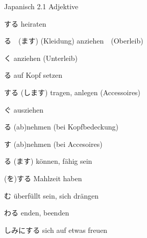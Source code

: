 \begin{multicols*}{2}
\begin{flushleft}
\begin{labeling}{Japanisch 2.1 Adjektive}
	\item [\ruby{結婚}{けっこん}する] heiraten
	\item [\ruby{着}{き}る　(\ruby{着}{き}ます)] (Kleidung) anziehen　(Oberleib)
	\item [\ruby{履}{は}く] anziehen (Unterleib)
	\item [\ruby{被}{かぶ}る] auf Kopf setzen
	\item [する (します)] tragen, anlegen (Accessoires)
	\item [\ruby{脱}{ぬ}ぐ] ausziehen
	\item [\ruby{取}{と}る] (ab)nehmen (bei Kopfbedeckung)
	\item [\ruby{外}{はず}す] (ab)nehmen (bei Accesoires)
	
	\item [\ruby{出来}{でき}る (\ruby{出来}{でき}ます)] können, fähig sein
	
	\item [\ruby{食事}{しょくじ}(を)する] Mahlzeit haben
	
	\item [\ruby{込}{こ}む] überfüllt sein, sich drängen
	\item [\ruby{終}{お}わる] enden, beenden
	\item [\ruby{楽}{たの}しみにする] sich auf etwas freuen
	
\end{labeling}
\end{flushleft}
\end{multicols*}
\clearpage